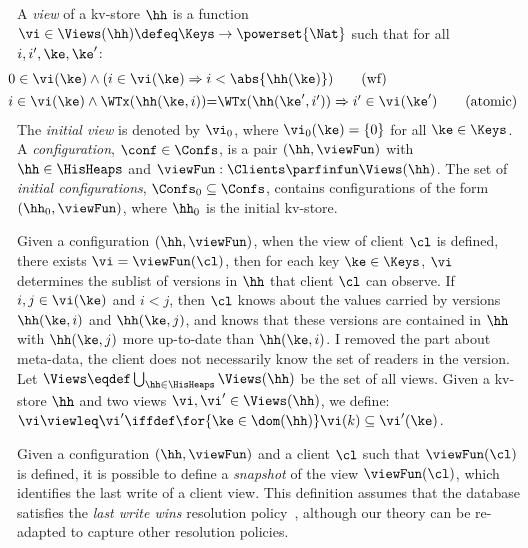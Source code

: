 \begin{definition}[Views]
\label{def:view}
\label{def:cuts}
\label{def:views}
\label{def:configuration}
A \emph{view} of a kv-store $\hh$ is a function
$\vi \in \Views(\hh) \defeq \Keys \to\powerset{\Nat}$ such that for all $i, i', \ke, \ke'$:
\begin{align}
    & \hspace*{-8pt}
    0 \in \vi(\ke) 
    \wedge (i \in \vi(\ke) \Rightarrow i < \abs{ \hh(\ke) }) 
    \tag{wf}
    \label{eq:view.wf}\\
    & \hspace*{-8pt}
    \begin{array}{@{}l@{}}
	i \in \vi(\ke)  
  	\land \WTx(\hh(\ke, i)) {=} \WTx(\hh(\ke', i'))  
  	\Rightarrow i' \in \vi(\ke')
    \end{array}
	\tag{atomic}
	\label{eq:view.atomic}
\end{align}
The \emph{initial view} is denoted by $\vi_{0}$, where $\vi_{0}(\ke) = \{0\}$ for all $\ke \in \Keys$. 
A \emph{configuration}, $\conf \in \Confs$,  is a pair $ (\hh, \viewFun)$
with $\hh \in \HisHeaps$ and
$\viewFun : \Clients \parfinfun \Views(\hh)$. 
The set of \emph{initial configurations}, $\Confs_0 \subseteq \Confs$, contains configurations of the form $ (\hh_0, \viewFun)$, where $\hh_0$ is the initial kv-store. 
\end{definition}
%


Given a configuration $(\hh, \viewFun)$, when the view of client 
$\cl$ is defined, \ie there exists $\vi = \viewFun(\cl)$, then for each key $\ke \in \Keys$, 
$\vi$ determines the sublist of versions in $\hh$ that client $\cl$ can observe. 
If $i,j \in \vi(\ke)$ and $i < j$, then $\cl$ knows about the values 
carried by versions $\hh(\ke, i)$ and  $\hh(\ke, j)$, 
and  knows that these versions are contained in $\hh$ with  $\hh(\ke, j)$ more 
up-to-date than $\hh(\ke, i)$. 
\ac{I removed the  part about meta-data, the client does not necessarily know the set of 
readers in the version.}
Let $\Views \eqdef \bigcup_{\hh \in \HisHeaps} \Views(\hh)$ be the set of all views. 
Given a kv-store $\hh$ and two views $\vi, \vi' \in \Views(\hh)$, 
we define: $\vi \viewleq \vi' \iffdef \for{\ke \in \dom(\hh)} \vi(k) \subseteq \vi'(\ke)$.

Given a configuration $(\hh, \viewFun)$ and a client $\cl$ such that $\viewFun(\cl)$ is
defined, it is possible to define a \emph{snapshot} of the
view $\viewFun  (\cl)$, which identifies the last write of a client
view. This definition assumes that the database satisfies the \emph{last write wins}
resolution policy~\cite{framewrk-concur}, although our theory can be 
re-adapted to capture other resolution policies. 

